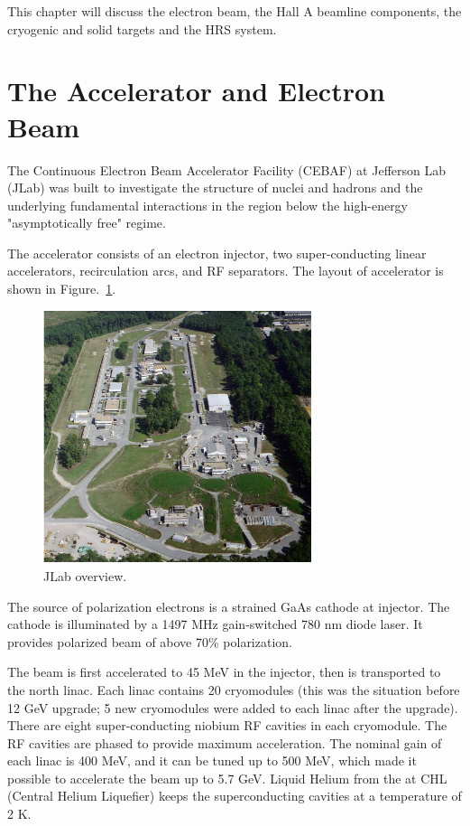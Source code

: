 This chapter will discuss the electron beam, the Hall A beamline components, the cryogenic and solid targets and the HRS system.

\section{The Accelerator and Electron Beam}
The Continuous Electron Beam Accelerator Facility (CEBAF) at Jefferson Lab (JLab) was built to investigate the structure
of nuclei and hadrons and the underlying fundamental interactions in the region below the high-energy "asymptotically
free" regime. 

The accelerator consists of an electron injector, two super-conducting linear accelerators, recirculation arcs,
and RF separators. The layout of accelerator is shown in Figure.~\ref{fig:JLab_overview}.


\begin{figure}[h]
\centering
\includegraphics[width=0.7\textwidth]{figs/JLab_overview.png}
\caption[JLab overview]{JLab overview.  \label{fig:JLab_overview}}
\end{figure}

The source of polarization electrons is a strained GaAs cathode at injector. The cathode is illuminated by a 1497 MHz
gain-switched 780 nm diode laser.  It provides polarized beam of above 70\% polarization.

The beam is first accelerated to 45 MeV in the injector, then is transported to the north linac. Each linac
contains 20 cryomodules (this was the situation before 12 GeV upgrade; 5 new cryomodules were added to each linac after the
upgrade). There are eight super-conducting niobium RF cavities in each cryomodule. The RF cavities are phased to provide
maximum acceleration. The nominal gain of each linac is 400 MeV, and it can be tuned up to 500 MeV, which made it possible to accelerate the beam up to 5.7 GeV.
Liquid Helium from the at CHL (Central Helium Liquefier) keeps the superconducting cavities at a temperature of 2 K.

